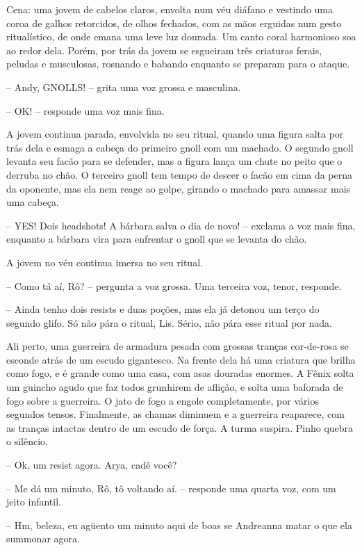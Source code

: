 

Cena: uma jovem de cabelos claros, envolta num véu diáfano e vestindo uma coroa de galhos retorcidos,
de olhos fechados, com as mãos erguidas num gesto ritualístico, de onde emana uma leve luz dourada.
Um canto coral harmonioso soa ao redor dela. Porém, por trás da jovem se esgueiram três criaturas
ferais, peludas e musculosas, rosnando e babando enquanto se preparam para o ataque.

-- Andy, GNOLLS! -- grita uma voz grossa e masculina.

-- OK! -- responde uma voz mais fina.

A jovem continua parada, envolvida no seu ritual, quando uma figura salta por trás dela e esmaga a cabeça do primeiro gnoll
com um machado. O segundo gnoll levanta seu facão para se defender, mas a figura lança um chute no peito que o derruba no chão.
O terceiro gnoll tem tempo de descer o facão em cima da perna da oponente, mas ela nem reage ao golpe, girando o machado para
amassar mais uma cabeça. 

-- YES! Dois headshots! A bárbara salva o dia de novo! -- exclama a voz mais fina, enquanto a bárbara vira para enfrentar o gnoll que se levanta do chão.

A jovem no véu continua imersa no seu ritual.

-- Como tá aí, Rô? -- pergunta a voz grossa. Uma terceira voz, tenor, responde.

-- Ainda tenho dois resists e duas poções, mas ela já detonou um terço do segundo glifo. 
Só não pára o ritual, Lis. Sério, não pára esse ritual por nada.

Ali perto, uma guerreira de armadura pesada com grossas tranças cor-de-rosa se esconde atrás de um escudo gigantesco. 
Na frente dela há uma criatura que brilha como fogo, e é grande como uma casa, com asas douradas enormes.
A Fênix solta um guincho agudo que faz todos grunhirem de aflição, e solta uma baforada de fogo sobre a guerreira.
O jato de fogo a engole completamente, por vários segundos tensos. Finalmente, as chamas diminuem e a guerreira reaparece,
com as tranças intactas dentro de um escudo de força. A turma suspira. Pinho quebra o silêncio.

-- Ok, um resist agora. Arya, cadê você?

-- Me dá um minuto, Rô, tô voltando aí. -- responde uma quarta voz, com um jeito infantil.

-- Hm, beleza, eu agüento um minuto aqui de boas se Andreanna matar o que ela summonar agora.

